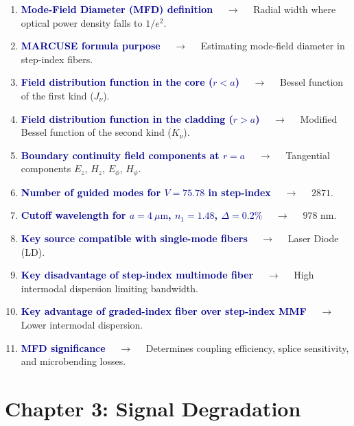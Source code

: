 \documentclass[11pt,a4paper]{article}
\begin{document}
\begin{enumerate}[label=\arabic*., leftmargin=*, labelsep=0.8em, itemsep=0.35em, parsep=0.1em, topsep=0.2em]
  \item \textcolor{darkblue}{\textbf{Mode-Field Diameter (MFD) definition}} $\quad\to\quad$ Radial width where optical power density falls to $1/e^2$.
  \item \textcolor{darkblue}{\textbf{MARCUSE formula purpose}} $\quad\to\quad$ Estimating mode-field diameter in step-index fibers.
  \item \textcolor{darkblue}{\textbf{Field distribution function in the core ($r < a$)}} $\quad\to\quad$ Bessel function of the first kind ($J_\nu$).
  \item \textcolor{darkblue}{\textbf{Field distribution function in the cladding ($r > a$)}} $\quad\to\quad$ Modified Bessel function of the second kind ($K_\nu$).
  \item \textcolor{darkblue}{\textbf{Boundary continuity field components at $r = a$}} $\quad\to\quad$ Tangential components $E_z$, $H_z$, $E_\phi$, $H_\phi$.
  \item \textcolor{darkblue}{\textbf{Number of guided modes for $V = 75.78$ in step-index}} $\quad\to\quad$ $2871$.
  \item \textcolor{darkblue}{\textbf{Cutoff wavelength for $a = 4\ \mu\text{m}$, $n_1=1.48$, $\Delta=0.2\%$}} $\quad\to\quad$ $978\text{ nm}$.
  \item \textcolor{darkblue}{\textbf{Key source compatible with single-mode fibers}} $\quad\to\quad$ Laser Diode (LD).
  \item \textcolor{darkblue}{\textbf{Key disadvantage of step-index multimode fiber}} $\quad\to\quad$ High intermodal dispersion limiting bandwidth.
  \item \textcolor{darkblue}{\textbf{Key advantage of graded-index fiber over step-index MMF}} $\quad\to\quad$ Lower intermodal dispersion.
  \item \textcolor{darkblue}{\textbf{MFD significance}} $\quad\to\quad$ Determines coupling efficiency, splice sensitivity, and microbending losses.
\end{enumerate}

\section*{Chapter 3: Signal Degradation}
\end{document}
